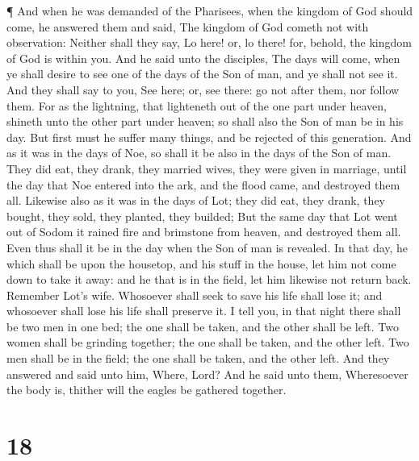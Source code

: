  ¶ And when he was demanded of the Pharisees, when the
kingdom of God should come, he answered them and said, The kingdom of
God cometh not with observation:  Neither shall they say,
Lo here! or, lo there! for, behold, the kingdom of God is within you.
 And he said unto the disciples, The days will come, when
ye shall desire to see one of the days of the Son of man, and ye shall
not see it.  And they shall say to you, See here; or, see
there: go not after them, nor follow them.  For as the
lightning, that lighteneth out of the one part under heaven, shineth
unto the other part under heaven; so shall also the Son of man be in his
day.  But first must he suffer many things, and be rejected
of this generation.  And as it was in the days of Noe, so
shall it be also in the days of the Son of man.  They did
eat, they drank, they married wives, they were given in marriage, until
the day that Noe entered into the ark, and the flood came, and destroyed
them all.  Likewise also as it was in the days of Lot; they
did eat, they drank, they bought, they sold, they planted, they builded;
 But the same day that Lot went out of Sodom it rained fire
and brimstone from heaven, and destroyed them all.  Even
thus shall it be in the day when the Son of man is revealed.
 In that day, he which shall be upon the housetop, and his
stuff in the house, let him not come down to take it away: and he that
is in the field, let him likewise not return back. 
Remember Lot's wife.  Whosoever shall seek to save his life
shall lose it; and whosoever shall lose his life shall preserve it.
 I tell you, in that night there shall be two men in one
bed; the one shall be taken, and the other shall be left. 
Two women shall be grinding together; the one shall be taken, and the
other left.  Two men shall be in the field; the one shall
be taken, and the other left.  And they answered and said
unto him, Where, Lord? And he said unto them, Wheresoever the body is,
thither will the eagles be gathered together.

\hypertarget{section-17}{%
\section{18}\label{section-17}}

